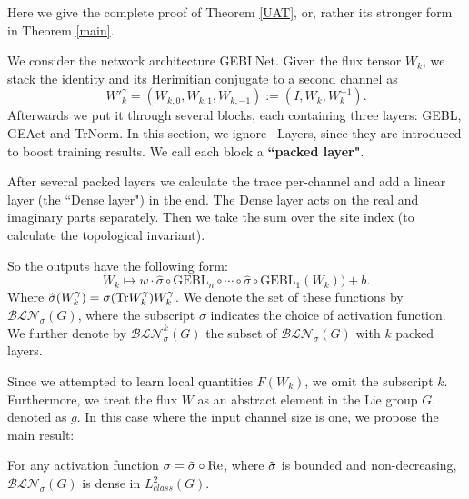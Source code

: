 Here we give the complete proof of Theorem \ref{UAT}, or, rather its stronger form in Theorem \ref{main}.

    We consider the network architecture GEBLNet. Given the flux tensor $W_k$, we stack the identity and its Herimitian conjugate to a second channel as 
    $$W'^\gamma_k =(W_{k,0}, W_{k,1}, W_{k, -1}):=(I,W_k, W_k^{-1}).$$
    Afterwards we put it through several blocks, each containing three layers: GEBL, GEAct and TrNorm. In this section, we ignore \trnorm\ Layers, since they are introduced to boost training results. We call each block a \textbf{``packed layer"}. 
    
    After several packed layers we calculate the trace per-channel and add a linear layer (the ``Dense layer") in the end. The Dense layer acts on the real and imaginary parts separately. Then we take the sum over the site index (to calculate the topological invariant).
    
    So the outputs have the following form:
    $$W_k\longmapsto w\cdot \hat{\sigma}\circ \text{GEBL}_n\circ \cdots \circ\hat{\sigma}\circ \text{GEBL}_1(W_k)) + b.$$
    Where $\hat{\sigma}(W^\gamma_k)=\sigma(\text{Tr} W^\gamma_k) W^\gamma_k$. We denote the set of these functions by $\mathcal{BLN}_{\sigma} (G)$, where the subscript $\sigma$ indicates the choice of activation function. We further denote by $\mathcal{BLN}_{\sigma}^k(G)$ the subset of $ \mathcal{BLN}_{\sigma}(G)$ with $k$ packed layers.

    Since we attempted to learn local quantities $F(W_k)$, we omit the subscript $k$. Furthermore, we treat the flux $W$ as an abstract element in the Lie group $G$, denoted as $g$. In this case where the input channel size is one, we propose the main result:
    

    \begin{theorem} For any activation function $\sigma=\tils\circ \re$, where $\Tilde{\sigma}$ is bounded and non-decreasing, $\mathcal{BLN}_{\sigma}(G)$ is dense in $L^2_{class}(G)$.
    \label{main}
    \end{theorem}

